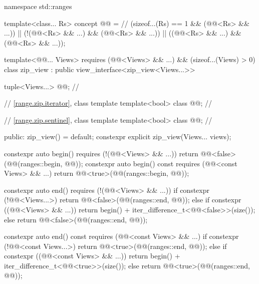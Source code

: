 %
%
%
\begin{codeblock}
namespace std::ranges {
  template<class... Rs>
  concept @@ =                             // \expos
    (sizeof...(Rs) == 1 && (@@<Rs> && ...)) ||
    (!(@@<Rs> && ...) && (@@<Rs> && ...)) ||
    ((@@<Rs> && ...) && (@@<Rs> && ...));

  template<@@... Views>
    requires (@@<Views> && ...) && (sizeof...(Views) > 0)
  class zip_view : public view_interface<zip_view<Views...>> {
    tuple<Views...> @@;             // \expos

    // \ref{range.zip.iterator}, class template 
    template<bool> class @@;      // \expos

    // \ref{range.zip.sentinel}, class template 
    template<bool> class @@;      // \expos

  public:
    zip_view() = default;
    constexpr explicit zip_view(Views... views);

    constexpr auto begin() requires (!(@@<Views> && ...)) {
      return @@<false>(@@(ranges::begin, @@));
    }
    constexpr auto begin() const requires (@@<const Views> && ...) {
      return @@<true>(@@(ranges::begin, @@));
    }

    constexpr auto end() requires (!(@@<Views> && ...)) {
      if constexpr (!@@<Views...>) {
        return @@<false>(@@(ranges::end, @@));
      } else if constexpr ((@@<Views> && ...)) {
        return begin() + iter_difference_t<@@<false>>(size());
      } else {
        return @@<false>(@@(ranges::end, @@));
      }
    }

    constexpr auto end() const requires (@@<const Views> && ...) {
      if constexpr (!@@<const Views...>) {
        return @@<true>(@@(ranges::end, @@));
      } else if constexpr ((@@<const Views> && ...)) {
        return begin() + iter_difference_t<@@<true>>(size());
      } else {
        return @@<true>(@@(ranges::end, @@));
      }
    }

}}
\end{codeblock}
